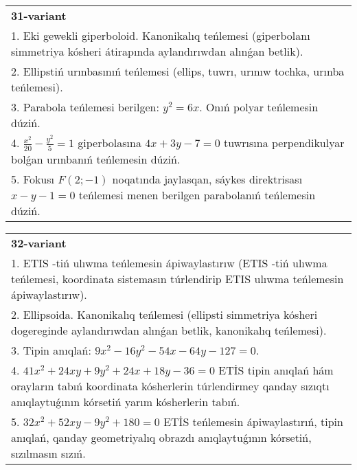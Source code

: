 \documentclass{article}
\begin{document}
\begin{tabular}{m{17cm}}
\textbf{31-variant}\\
1. Eki gewekli giperboloid. Kanonikalıq teńlemesi (giperbolanı simmetriya kósheri átirapında aylandırıwdan alınǵan betlik).\\

2. Ellipstiń urınbasınıń teńlemesi (ellips, tuwrı, urınıw tochka, urınba teńlemesi).\\

3. Parabola teńlemesi berilgen: $y^2=6 x$. Onıń polyar teńlemesin dúziń.\\

4. $\frac{x^{2}}{20} - \frac{y^{2}}{5} = 1$ giperbolasına $4x + 3y - 7 = 0$ tuwrısına perpendikulyar bolǵan urınbanıń teńlemesin dúziń.  \\

5. Fokusı $F(2; - 1)$ noqatında jaylasqan, sáykes direktrisası $x - y - 1 = 0$ teńlemesi menen berilgen parabolanıń teńlemesin dúziń.  
\end{tabular}
\vspace{1cm}


\begin{tabular}{m{17cm}}
\textbf{32-variant}\\
1. ETIS -tiń ulıwma teńlemesin ápiwaylastırıw (ETIS -tiń ulıwma teńlemesi, koordinata sistemasın túrlendirip ETIS ulıwma teńlemesin ápiwaylastırıw).\\

2. Ellipsoida. Kanonikalıq teńlemesi (ellipsti simmetriya kósheri dogereginde aylandırıwdan alınǵan betlik, kanonikalıq teńlemesi).\\

3. Tipin anıqlań: $9 x^{2}-16 y^{2}-54 x-64 y-127=0$.\\

4. $41x^{2} + 24xy + 9y^{2} + 24x + 18y - 36 = 0$ ETİS tipin anıqlań hám orayların tabıń koordinata kósherlerin túrlendirmey qanday sızıqtı anıqlaytuǵının kórsetiń yarım kósherlerin tabıń.  \\

5. $32x^{2} + 52xy - 9y^{2} + 180 = 0$ ETİS teńlemesin ápiwaylastırıń, tipin anıqlań, qanday geometriyalıq obrazdı anıqlaytuǵının kórsetiń, sızılmasın sızıń.  
\end{tabular}
\vspace{1cm}
\end{document}

